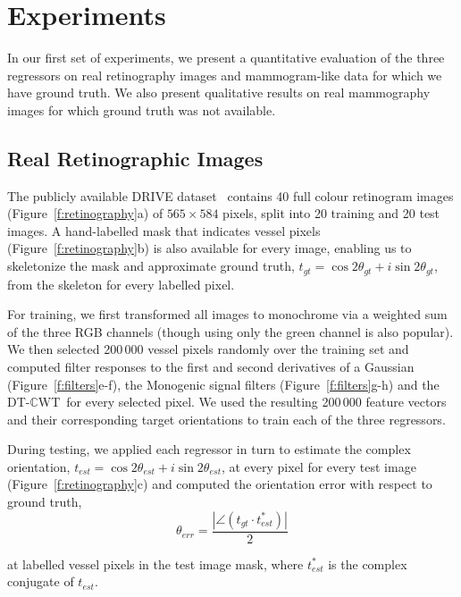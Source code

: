 \documentclass[runningheads,a4paper]{llncs}
\newcommand{\fref}[1]{Figure~\ref{#1}}
\def\dtcwt{DT-$\mathbb{C}$WT}
\newcommand{\comment}[1]{}
\begin{document}
\section{Experiments}
\label{s:expts}
In our first set of experiments, we present a quantitative evaluation of the three regressors on real retinography images and mammogram-like data for which we have ground truth. We also present qualitative results on real mammography images for which ground truth was not available.
\comment{Are differences statistically significant?}


\subsection{Real Retinographic Images}
\label{s:expts_retinography}
The publicly available DRIVE dataset~\cite{Staal_etal_TMI04} contains 40 full colour retinogram images (\fref{f:retinography}a) of $565{\times}584$ pixels, split into 20 training and 20 test images. A hand-labelled mask that indicates vessel pixels (\fref{f:retinography}b) is also available for every image, enabling us to skeletonize the mask and approximate ground truth, $t_{gt} = \cos 2\theta_{gt} + i\sin 2\theta_{gt}$, from the skeleton for every labelled pixel.\comment{It is questionable how well this constitutes ground truth}

For training, we first transformed all images to monochrome via a weighted sum of the three RGB channels (though using only the green channel is also popular). We then selected 200\,000 vessel pixels randomly over the training set and computed filter responses to the first and second derivatives of a Gaussian (\fref{f:filters}e-f), the Monogenic signal filters (\fref{f:filters}g-h) and the \dtcwt~for every selected pixel. We used the resulting 200\,000 feature vectors and their corresponding target orientations to train each of the three regressors.
\comment{Why 200k points? Was this limit dictated by system requirements?}

During testing, we applied each regressor in turn to estimate the complex orientation, $t_{est} = \cos 2\theta_{est} + i\sin 2\theta_{est}$, at every pixel for every test image (\fref{f:retinography}c) and computed the orientation error with respect to ground truth,
%
\begin{equation}
	\theta_{err} = \frac{|\angle(t_{gt} \cdot t_{est}^*)|}{2}
\end{equation}

\noindent at labelled vessel pixels in the test image mask, where $t_{est}^*$ is the complex conjugate of $t_{est}$.
\end{document}
